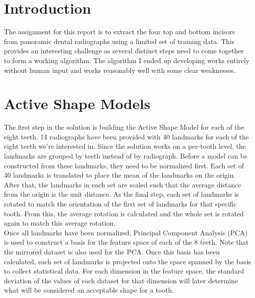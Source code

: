 \documentclass[a4paper,10pt]{article}
\begin{document}



\newpage
\section{Introduction}
The assignment for this report is to extract the four top and bottom incisors from panoramic dental radiographs using a limited set of training data. This provides an interesting challenge as several distinct steps need to come together to form a working algorithm. The algorithm I ended up developing works entirely without human input and works reasonably well with some clear weaknesses.

\section{Active Shape Models}
The first step in the solution is building the Active Shape Model for each of the eight teeth. 14 radiographs have been provided with 40 landmarks for each of the eight teeth we're interested in. Since the solution works on a per-tooth level, the landmarks are grouped by teeth instead of by radiograph. Before a model can be constructed from these landmarks, they need to be normalized first. Each set of 40 landmarks is translated to place the mean of the landmarks on the origin. After that, the landmarks in each set are scaled such that the average distance from the origin is the unit distance. As the final step, each set of landmarks is rotated to match the orientation of the first set of landmarks for that specific tooth. From this, the average rotation is calculated and the whole set is rotated again to match this average rotation.
\\
Once all landmarks have been normalized, Principal Component Analysis (PCA) is used to construct a basis for the feature space of each of the 8 teeth. Note that the mirrored dataset is also used for the PCA. Once this basis has been calculated, each set of landmarks is projected onto the space spanned by the basis to collect statistical data. For each dimension in the feature space, the standard deviation of the values of each dataset for that dimension will later determine what will be considered an acceptable shape for a tooth.
\end{document}

